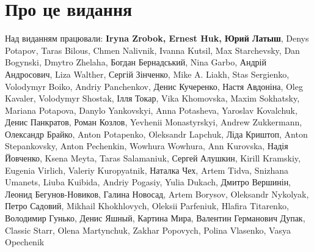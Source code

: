 \section{Про це видання}

Над виданням працювали:
\textbf{Iryna Zrobok, Ernest Huk, Юрий Латыш},
Denys Potapov, Taras Bilous, Chmen Nalivnik, Ivanna Kutsil, Max Starchevsky, Dan Bogynski, Dmytro Zhelaha, Богдан Бернадський, Nina Garbo, Андрій Андросович, Liza Walther, Сергій Зінченко,
Mike A. Liakh, Stas Sergienko, Volodymyr Boiko, Andriy Panchenkov, Денис Кучеренко, Настя Авдоніна, Oleg Kavaler, Volodymyr Shostak, Ілля Токар, Vika Khomovska, Maxim Sokhatsky, Mariana Potapova, Danylo Yankovskyi, Anna Potasheva, Yaroslav Kovalchuk, Денис Панкратов, Роман Козлов, \textenglish{Yevhenii Mo\-nas\-tyr\-skyi}, Andrew Zukkermann, Олександр Брайко, Anton Potapenko, Oleksandr Lapchuk, Ліда Криштоп, Anton Stepankovsky, Anton Pechenkin, Wowhura Wowhura, Ann Kurovska, Надія Йовченко, Ksena Meyta, Taras Salamaniuk, Сергей Алушкин, Kirill Kramskiy, Eugenia Virlich, Valeriy Kuropyatnik, Наталка Чех, Artem Tidva, Snizhana Umanets, Liuba Kuibida, Andriy Pogasiy, Yulia Dukach, Дмитро Вершинін, Леонид Бегунов-Новиков, Галина Новосад, Artem Borysov, Oleksandr Nykolyak, Петро Садовий, Mikhail Khokhlovych, Oleksii Parfeniuk, Hlafira Titarenko, Володимир Гунько, Денис Яшный, Картина Мира, Валентин Германович Дупак, Classic Starr, Olena Martynchuk, Zakhar Popovych, Polina Vlasenko, Vasya Opechenik

\cleardoublepage